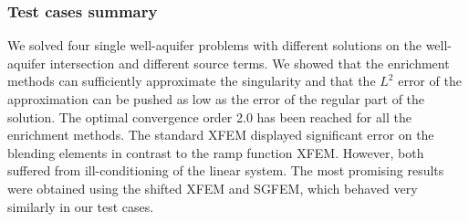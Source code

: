 
\subsubsection{Test cases summary}
We solved four single well-aquifer problems with different solutions on the well-aquifer intersection and different source terms.
We showed that the enrichment methods can sufficiently approximate the singularity and that the $L^2$ error of the approximation
can be pushed as low as the error of the regular part of the solution. The optimal convergence order 2.0 has been reached for all
the enrichment methods. The standard XFEM displayed significant error on the blending elements in contrast to the ramp function XFEM.
However, both suffered from ill-conditioning of the linear system. The most promising results were obtained using the shifted XFEM
and SGFEM, which behaved very similarly in our test cases.

